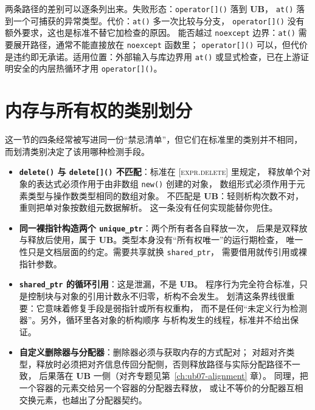 \documentclass[12pt,a4paper,fontset=fandol]{ctexbook}
\newcommand{\Fn}[1]{\texttt{#1()}}
\newcommand{\Tp}[1]{\texttt{#1}}
\newcommand{\Bk}{\discretionary{}{}{}}
\newcommand{\UB}{\textbf{\textsf{UB}}}
\newcommand{\Std}[1]{\textsc{[#1]}}
\begin{document}
\begin{compare}[title={检查与不检查的契约对比}]
两条路径的差别可以逐条列出来。失败形态：\Fn{operator[]} 落到 \UB{}，
\Fn{at} 落到一个可捕获的异常类型。代价：\Fn{at} 多一次比较与分支，
\Fn{operator[]} 没有额外要求，这也是标准不替它加检查的原因。
能否越过 \Tp{noexcept} 边界：\Fn{at} 需要展开路径，通常不能直接放在 \Tp{noexcept} 函数里；
\Fn{operator[]} 可以，但代价是违约即无承诺。适用位置：外部输入与库边界用 \Fn{at}
或显式检查，已在上游证明安全的内层热循环才用 \Fn{operator[]}。
\end{compare}

\section{内存与所有权的类别划分}\label{sec:ub12-memory}

这一节的四条经常被写进同一份“禁忌清单”，但它们在标准里的类别并不相同，
而划清类别决定了该用哪种检测手段。

\begin{itemize}
  \item \textbf{\Fn{delete} 与 \Fn{delete[]} 不匹配}：标准在 \Std{expr.delete} 里规定，
        释放单个对象的表达式必须作用于由非数组 \Fn{new} 创建的对象，
        数组形式必须作用于元素类型与操作数类型相同的数组对象。
        不匹配是 \UB{}：轻则析构次数不对，重则把单对象按数组元数据解析。
        这一条没有任何实现能替你兜住。
  \item \textbf{同一裸指针构造两个 \Tp{unique{\Bk}\_ptr}}：两个所有者各自释放一次，
        后果是双释放与释放后使用，属于 \UB{}。类型本身没有“所有权唯一”的运行期检查，
        唯一性只是文档层面的约定。需要共享就换 \Tp{shared{\Bk}\_ptr}，
        需要借用就传引用或裸指针参数。
  \item \textbf{\Tp{shared{\Bk}\_ptr} 的循环引用}：这是泄漏，不是 \UB{}。
        程序行为完全符合标准，只是控制块与对象的引用计数永不归零，析构不会发生。
        划清这条界线很重要：它意味着修复手段是弱指针或所有权重构，
        而不是任何“未定义行为检测器”。另外，循环里各对象的析构顺序
        与析构发生的线程，标准并不给出保证。
  \item \textbf{自定义删除器与分配器}：删除器必须与获取内存的方式配对；
        对超对齐类型，释放时必须把对齐信息传回分配侧，否则释放路径与实际分配路径不一致，
        后果落在 \UB{} 一侧（对齐专题见第~\ref{ch:ub07-alignment} 章）。
        同理，把一个容器的元素交给另一个容器的分配器去释放，
        或让不等价的分配器互相交换元素，也越出了分配器契约。
\end{itemize}
\end{document}
